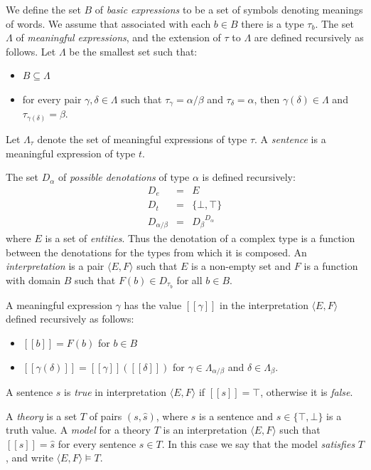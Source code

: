 \documentclass[11pt]{article}
\theoremstyle{definition}
\newcommand{\interp}[1]{[\![ #1 ]\!]}
\begin{document}
We define the set $B$ of \emph{basic expressions} to be a set of
symbols denoting meanings of words. We assume that associated with
each $b\in B$ there is a type $\tau_b$. The set $\Lambda$ of
\emph{meaningful expressions}, and the extension of $\tau$ to $\Lambda$ are
defined recursively as follows. Let $\Lambda$ be the smallest set such that:
\begin{itemize}
\item $B\subseteq \Lambda$
\item for every pair $\gamma,\delta\in \Lambda$ such that $\tau_\gamma
  = \alpha/\beta$ and $\tau_\delta = \alpha$, then $\gamma(\delta)\in
  \Lambda$ and $\tau_{\gamma(\delta)} = \beta$.
\end{itemize}
Let $\Lambda_\tau$ denote the set of meaningful expressions of type
$\tau$. A \emph{sentence} is a meaningful expression of type $t$.


The set $D_\alpha$ of \emph{possible denotations} of type $\alpha$ is
defined recursively:
\begin{eqnarray*}
D_e &=& E\\
D_t &=& \{\bot,\top\}\\
D_{\alpha/\beta} &=& {D_\beta}^{D_\alpha}
\end{eqnarray*}
where $E$ is a set of \emph{entities}. Thus the denotation of a
complex type is a function between the denotations for the types from
which it is composed. An \emph{interpretation} is a pair $\langle E,
F\rangle$ such that $E$ is a non-empty set and $F$ is a function with
domain $B$ such that $F(b) \in D_{\tau_b}$ for all $b\in B$.

A meaningful expression $\gamma$ has the value $\interp{\gamma}$ in the
interpretation $\langle E, F\rangle$ defined recursively as follows:
\begin{itemize}
\item $\interp{b} = F(b)$ for $b\in B$
\item $\interp{\gamma(\delta)} = \interp{\gamma}(\interp{\delta})$ for $\gamma
  \in \Lambda_{\alpha/\beta}$ and $\delta \in \Lambda_\beta$.
\end{itemize}
A sentence $s$ is \emph{true} in interpretation $\langle E, F\rangle$
if $\interp{s} = \top$, otherwise it is \emph{false}.

A \emph{theory} is a set $T$ of pairs $(s,\hat{s})$, where $s$ is a
sentence and $\hat{s}\in\{\top,\bot\}$ is a truth value. A
\emph{model} for a theory $T$ is an interpretation $\langle E,
F\rangle$ such that $\interp{s} = \hat{s}$ for every sentence $s\in
T$. In this case we say that the model \emph{satisfies} $T$, and write
$\langle E, F\rangle \models T$.
\end{document}
